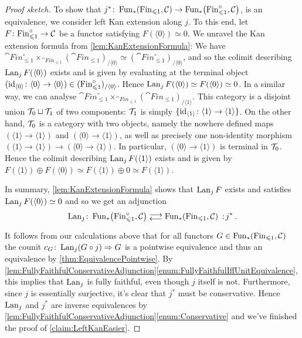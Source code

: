 \begin{proof}[Proof sketch]
	To show that $j^*\colon \operatorname{Fun}_*\!\left(\mathrm{Fin}_{\leqslant 1},\mathcal{C}\right)\rightarrow\operatorname{Fun}_*\!\left(\mathrm{Fin}_{\leqslant 1}^\circ,\mathcal{C}\right)$, is an equivalence, we consider left Kan extension along $j$. To this end, let $F\colon \mathrm{Fin}_{\leqslant1}^\circ\rightarrow \mathcal{C}$ be a functor satisfying $F(\langle0\rangle)\simeq 0$. We unravel the Kan extension formula from \cref{lem:KanExtensionFormula}: We have $\cat{Fin}_{\leqslant 1}^\circ\times_{\cat{Fin}_{\leqslant 1}}(\cat{Fin}_{\leqslant 1})_{/\langle 0\rangle}\simeq (\cat{Fin}_{\leqslant 1}^\circ)_{/\langle 0\rangle}$, and so the colimit describing $\operatorname{Lan}_jF(\langle 0\rangle)$ exists and is given by evaluating at the terminal object $(\operatorname{id}_{\langle 0\rangle}\colon \langle 0\rangle\rightarrow \langle 0\rangle)\in (\mathrm{Fin}_{\leqslant 1}^\circ)_{/\langle 0\rangle}$. Hence $\operatorname{Lan}_jF(\langle 0\rangle)\simeq F(\langle 0\rangle)\simeq 0$. In a similar way, we can analyse $\cat{Fin}_{\leqslant 1}^\circ\times_{\cat{Fin}_{\leqslant 1}}(\cat{Fin}_{\leqslant 1})_{/\langle 1\rangle}$. This category is a disjoint union $\mathcal{T}_0\sqcup \mathcal{T}_1$ of two components: $\mathcal{T}_1$ is simply $\{\operatorname{id}_{\langle 1\rangle}\colon \langle 1\rangle\rightarrow \langle 1\rangle\}$. On the other hand, $\mathcal{T}_0$ is a category with two objects, namely the nowhere defined maps $(\langle 1\rangle \rightarrow \langle 1\rangle)$ and $(\langle 0\rangle \rightarrow \langle 1\rangle)$, as well as precisely one non-identity morphism $(\langle 1\rangle \rightarrow \langle 1\rangle)\rightarrow (\langle 0\rangle \rightarrow \langle 1\rangle)$. In particular, $(\langle 0\rangle\rightarrow \langle 1\rangle)$ is terminal in $\mathcal{T}_0$. Hence the colimit describing $\operatorname{Lan}_jF(\langle 1\rangle)$ exists and is given by $F(\langle 1\rangle)\oplus F(\langle 0\rangle)\simeq F(\langle 1\rangle)\oplus 0\simeq F(\langle 1\rangle)$.
	
	In summary, \cref{lem:KanExtensionFormula} shows that $\operatorname{Lan}_jF$ exists and satisfies $\operatorname{Lan}_jF(\langle 0\rangle)\simeq 0$ and so we get an adjunction 
	\begin{equation*}
		\Lan_j\colon \Fun_*\!\left(\cat{Fin}_{\leqslant 1}^\circ,\Cc\right)\doublelrmorphism  \Fun_*\!\left(\cat{Fin}_{\leqslant 1},\Cc\right)\noloc j^*\,.
	\end{equation*}
	It follows from our calculations above that for all functors $G\in\operatorname{Fun}_*(\mathrm{Fin}_{\leqslant 1},\mathcal{C})$ the counit $c_G\colon \operatorname{Lan}_j(G\circ j)\Rightarrow G$ is a pointwise equivalence and thus an equivalence by \cref{thm:EquivalencePointwise}. By \cref{lem:FullyFaithfulConservativeAdjunction}\cref{enum:FullyFaithfulIffUnitEquivalence}, this implies that $\operatorname{Lan}_j$ is fully faithful, even though $j$ itself is not. Furthermore, since $j$ is essentially surjective, it's clear that $j^*$ must be conservative. Hence $\operatorname{Lan}_j$ and $j^*$ are inverse equivalences by \cref{lem:FullyFaithfulConservativeAdjunction}\cref{enum:Conservative} and we've finished the proof of \cref{claim:LeftKanEasier}. 
	

\end{proof}
